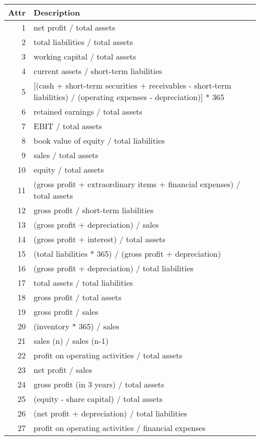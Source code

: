 \begin{table*}
\centering
\begin{tabular}[t]{|r|p{6cm}| }
     \hline
     \textbf{Attr} & \textbf{Description} \\
     \hline
    1	&	net profit / total assets \\
    2	&	total liabilities / total assets \\
    3	&	working capital / total assets \\
    4	&	current assets / short-term liabilities \\
    5	&	[(cash + short-term securities + receivables - short-term liabilities) / (operating expenses - depreciation)] * 365 \\
    6	&	retained earnings / total assets \\
    7	&	EBIT / total assets \\
    8	&	book value of equity / total liabilities \\
    9	&	sales / total assets \\
    10	&	equity / total assets \\
    11	&	(gross profit + extraordinary items + financial expenses) / total assets \\
    12	&	gross profit / short-term liabilities \\
    13	&	(gross profit + depreciation) / sales \\
    14	&	(gross profit + interest) / total assets \\
    15	&	(total liabilities * 365) / (gross profit + depreciation) \\
    16	&	(gross profit + depreciation) / total liabilities \\
    17	&	total assets / total liabilities \\
    18	&	gross profit / total assets \\
    19	&	gross profit / sales \\
    20	&	(inventory * 365) / sales \\
    21	&	sales (n) / sales (n-1) \\
    22	&	profit on operating activities / total assets \\
    23	&	net profit / sales \\
    24	&	gross profit (in 3 years) / total assets \\
    25	&	(equity - share capital) / total assets \\
    26	&	(net profit + depreciation) / total liabilities \\
    27	&	profit on operating activities / financial expenses \\

\end{tabular}
\end{table*}
